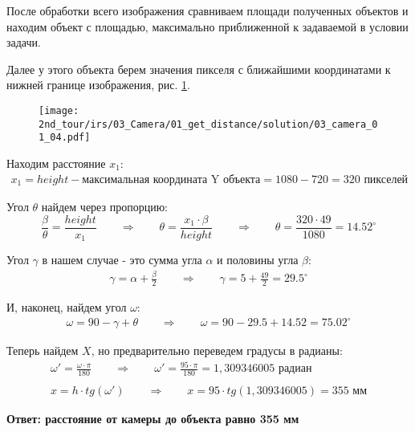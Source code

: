 После обработки всего изображения сравниваем площади полученных объектов и находим объект с площадью, максимально приближенной к задаваемой в условии задачи.

Далее у этого объекта берем значения пикселя с ближайшими координатами к нижней границе изображения, рис. \ref{fig:03_camera_01_04}.
\\
\begin{figure}[h!]
	\centering
	\texttt{[image: 2nd\_tour/irs/03\_Camera/01\_get\_distance/solution/03\_camera\_01\_04.pdf]}
	\caption{}
	\label{fig:03_camera_01_04}
\end{figure}

Находим расстояние $x_1$:
\begin{align*}
x_1 = height - \text{максимальная координата Y объекта} = 1080 - 720 = 320 \text{ пикселей}
\end{align*}

Угол $\theta$ найдем через пропорцию:
\begin{equation*}
\frac{\beta}{\theta} = \frac{height}{x_1} \qquad \Rightarrow \qquad \theta = \frac{x_1 \cdot \beta}{height} \qquad \Rightarrow \qquad \theta = \frac{320 \cdot 49}{1080} = 14.52 ^\circ
\end{equation*}

Угол $\gamma$ в нашем случае - это сумма угла $\alpha$ и половины угла $\beta$:
\begin{align*}
\gamma = \alpha + \frac{\beta}{2} \qquad \Rightarrow \qquad \gamma = 5 +  \frac{49}{2} = 29.5^\circ
\end{align*}

И, наконец, найдем угол $\omega$:
\begin{align*}
\omega = 90 - \gamma + \theta \qquad \Rightarrow \qquad \omega = 90 - 29.5 + 14.52 = 75.02^\circ
\end{align*}

Теперь найдем $X$, но предварительно переведем градусы в радианы:
\begin{align*}
\omega' = \frac{\omega \cdot \pi}{180} \qquad \Rightarrow \qquad \omega' = \frac{95 \cdot \pi}{180} = 1,309346005 \text{ радиан} \\ \\
x = h \cdot tg(\omega') \qquad \Rightarrow \qquad x = 95 \cdot tg(1,309346005) = 355 \text{ мм}
\end{align*}

\textbf{Ответ: расстояние от камеры до объекта равно 355 мм}

\codeExample

